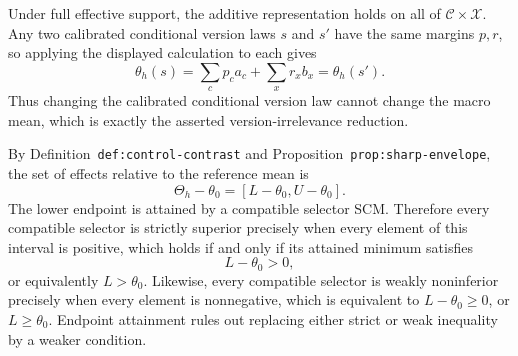 Under full effective support, the additive representation holds on all of \(\mathcal C\times\mathcal X\).  Any two calibrated conditional version laws \(s\) and \(s'\) have the same margins \(p,r\), so applying the displayed calculation to each gives
\[
\theta_h(s)=\sum_cp_ca_c+\sum_xr_xb_x=\theta_h(s').
\]
Thus changing the calibrated conditional version law cannot change the macro mean, which is exactly the asserted version-irrelevance reduction.

By Definition~\texttt{def:control-contrast} and Proposition~\texttt{prop:sharp-envelope}, the set of effects relative to the reference mean is
\[
\Theta_h-\theta_0=[L-\theta_0,U-\theta_0].
\]
The lower endpoint is attained by a compatible selector SCM.  Therefore every compatible selector is strictly superior precisely when every element of this interval is positive, which holds if and only if its attained minimum satisfies
\[
L-\theta_0>0,
\]
or equivalently \(L>\theta_0\).  Likewise, every compatible selector is weakly noninferior precisely when every element is nonnegative, which is equivalent to \(L-\theta_0\geq0\), or \(L\geq\theta_0\).  Endpoint attainment rules out replacing either strict or weak inequality by a weaker condition.
